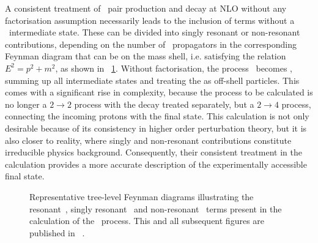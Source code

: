 A consistent treatment of \tquark\ pair production and decay at \gls{NLO} without any factorisation assumption necessarily leads to the inclusion of terms without a \ttbar\ intermediate state. These can be divided into singly resonant or non-resonant contributions, depending on the number of \tquark\ propagators in the corresponding Feynman diagram that can be on the mass shell, i.e. satisfying the relation $E^2=p^2+m^2$, as shown in \fig~\ref{fig:resonant}. Without factorisation, the process \ppttbarWWbb\ becomes \ppWWbb, summing up all intermediate states and treating the  as off-shell particles. This comes with a significant rise in complexity, because the process to be calculated is no longer a $2 \to 2$ process with the decay treated separately, but a $2 \to 4$ process, connecting the incoming protons with the final state. This calculation is not only desirable because of its consistency in higher order perturbation theory, but it is also closer to reality, where singly and non-resonant contributions constitute irreducible physics background. Consequently, their consistent treatment in the calculation provides a more accurate description of the experimentally accessible final state.
%
\begin{figure}[tbp!]
\centering
{}
\caption[Terms in a \ppWWbb\ calculation]{
%
Representative tree-level Feynman diagrams illustrating the resonant~, singly resonant~ and non-resonant~ terms present in the calculation of the \ppWWbb\ process.
%
This and all subsequent figures are published in ~\cite{Heinrich2014}.
%
\label{fig:resonant}
}
\end{figure}
